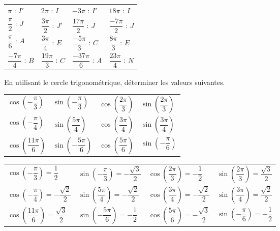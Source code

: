 \documentclass[11pt,fleqn, openany]{book} %
\begin{document}
\begin{solution}

\renewcommand{\arraystretch}{2}\begin{tabularx}{\linewidth}{XXXX}
$\pi$ : $I'$ & $2\pi$ : $I$ & $-3\pi$ : $I'$ & $18\pi$ : $I$ \\
$\dfrac{\pi}{2}$ : $J$& $\dfrac{3\pi}{2}$ : $J'$ & $\dfrac{17\pi}{2}$ : $J$ & $\dfrac{-7\pi}{2}$ : $J$\\
$\dfrac{\pi}{6}$ : $A$& $\dfrac{3\pi}{4}$ : $E$ & $\dfrac{-5\pi}{3}$ : $C$ & $\dfrac{8\pi}{3}$ : $E$\\
$\dfrac{-7\pi}{4}$ : $B$ & $\dfrac{19\pi}{3}$ : $C$ & $\dfrac{-37\pi}{6}$ : $A$ & $\dfrac{23\pi}{4}$ : $N$\end{tabularx}

\end{solution}



\begin{exercise} En utilisant le cercle trigonométrique, déterminer les valeurs suivantes.

\begin{tabularx}{\linewidth}{XXXX}
$\cos \left( -\dfrac{\pi}{3} \right)$ & $\sin \left(- \dfrac{\pi}{3} \right)$ & $\cos \left( \dfrac{2\pi}{3} \right)$ & $\sin \left( \dfrac{2\pi}{3} \right)$ \\
$\cos \left( -\dfrac{\pi}{4} \right)$ & $\sin \left( \dfrac{5\pi}{4} \right)$ & $\cos \left( \dfrac{3\pi}{4} \right)$ & $\sin \left( \dfrac{3\pi}{4} \right)$ \\
$\cos \left( \dfrac{11\pi}{6} \right)$ & $\sin \left(- \dfrac{5\pi}{6} \right)$ & $\cos \left( \dfrac{5\pi}{6} \right)$ & $\sin \left( -\dfrac{\pi}{6} \right)$ 
\end{tabularx}\end{exercise}


\begin{solution}

\begin{tabularx}{\linewidth}{XXXX}
$\cos \left( -\dfrac{\pi}{3} \right) = \dfrac{1}{2}$ & $\sin \left(- \dfrac{\pi}{3} \right)=-\dfrac{\sqrt{3}}{2}$ & $\cos \left( \dfrac{2\pi}{3} \right) = -\dfrac{1}{2}$ & $\sin \left( \dfrac{2\pi}{3} \right) = \dfrac{\sqrt{3}}{2}$ \\
$\cos \left( -\dfrac{\pi}{4} \right) = -\dfrac{\sqrt{2}}{2}$ & $\sin \left( \dfrac{5\pi}{4} \right)=-\dfrac{\sqrt{2}}{2}$ & $\cos \left( \dfrac{3\pi}{4} \right)=-\dfrac{\sqrt{2}}{2}$ & $\sin \left( \dfrac{3\pi}{4} \right) = \dfrac{\sqrt{2}}{2}$ \\
$\cos \left( \dfrac{11\pi}{6} \right)=\dfrac{\sqrt{3}}{2}$ & $\sin \left(- \dfrac{5\pi}{6} \right)=-\dfrac{1}{2}$ & $\cos \left( \dfrac{5\pi}{6} \right)=-\dfrac{\sqrt{3}}{2}$ & $\sin \left( -\dfrac{\pi}{6} \right)=-\dfrac{1}{2}$ 
\end{tabularx}\end{solution}
\end{document}
